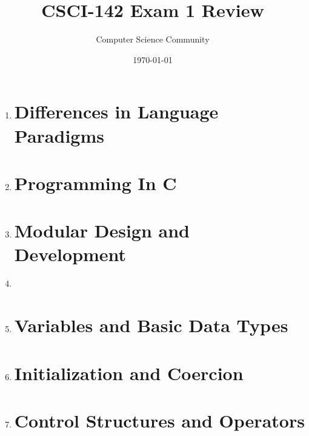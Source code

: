 \documentclass[11pt]{article}
\title{CSCI-142 Exam 1 Review}
\author{Computer Science Community}
\date{\today}
\begin{document}
\header

\begin{enumerate}

\section*{History and Evolution of Programming Languages}

	\item 

\section*{Differences in Language Paradigms}

	\item 

\section*{Programming In C}

	\item 

\newpage
\section*{Modular Design and Development}

	\item 
	\item 

\section*{Variables and Basic Data Types}

	\item 

\newpage
\section*{Initialization and Coercion}

	\item 

\pagebreak
\section*{Control Structures and Operators}


\end{enumerate}
\end{document}
